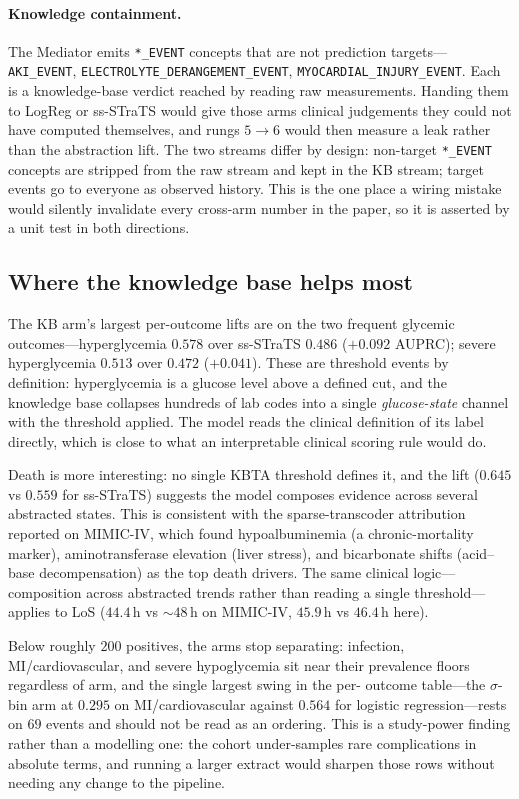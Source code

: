 \paragraph{Knowledge containment.}
The Mediator emits \texttt{*\_EVENT} concepts that are not prediction
targets---\texttt{AKI\_EVENT}, \texttt{ELECTROLYTE\_DERANGEMENT\_EVENT},
\texttt{MYOCARDIAL\_INJURY\_EVENT}. Each is a knowledge-base verdict
reached by reading raw measurements. Handing them to LogReg or
ss-STraTS would give those arms clinical judgements they could not have
computed themselves, and rungs $5 \to 6$ would then measure a leak
rather than the abstraction lift. The two streams differ by design:
non-target \texttt{*\_EVENT} concepts are stripped from the raw stream
and kept in the KB stream; target events go to everyone as observed
history. This is the one place a wiring mistake would silently
invalidate every cross-arm number in the paper, so it is asserted by a
unit test in both directions.

\subsection{Where the knowledge base helps most}

The KB arm's largest per-outcome lifts are on the two frequent glycemic
outcomes---hyperglycemia $0.578$ over ss-STraTS $0.486$ ($+0.092$
AUPRC); severe hyperglycemia $0.513$ over $0.472$ ($+0.041$). These are
threshold events by definition: hyperglycemia is a glucose level above
a defined cut, and the knowledge base collapses hundreds of lab codes
into a single \emph{glucose-state} channel with the threshold applied.
The model reads the clinical definition of its label directly, which is
close to what an interpretable clinical scoring rule would do.

Death is more interesting: no single KBTA threshold defines it, and the
lift ($0.645$ vs $0.559$ for ss-STraTS) suggests the model composes
evidence across several abstracted states. This is consistent with the
sparse-transcoder attribution reported on MIMIC-IV, which found
hypoalbuminemia (a chronic-mortality marker), aminotransferase
elevation (liver stress), and bicarbonate shifts (acid--base
decompensation) as the top death drivers. The same clinical logic---
composition across abstracted trends rather than reading a single
threshold---applies to LoS ($44.4$\,h vs $\sim 48$\,h on MIMIC-IV,
$45.9$\,h vs $46.4$\,h here).

Below roughly $200$ positives, the arms stop separating: infection,
MI/cardiovascular, and severe hypoglycemia sit near their prevalence
floors regardless of arm, and the single largest swing in the per-
outcome table---the $\sigma$-bin arm at $0.295$ on MI/cardiovascular
against $0.564$ for logistic regression---rests on $69$ events and
should not be read as an ordering. This is a study-power finding rather
than a modelling one: the cohort under-samples rare complications in
absolute terms, and running a larger extract would sharpen those rows
without needing any change to the pipeline.


